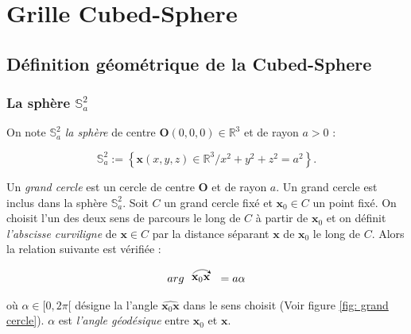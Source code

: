 \chapter{Grille Cubed-Sphere}

\section{Définition géométrique de la Cubed-Sphere}

\subsection{La sphère $\mathbb{S}_a^2$}

On note $\mathbb{S}_a^2$ \textit{la sphère} de centre $\mathbf{O} (0,0,0) \in \mathbb{R}^3$ et de rayon $a>0$ :

\begin{equation}
\mathbb{S}_a^2 := \left\lbrace
\mathbf{x} (x,y,z) \in \mathbb{R}^3 / x^2+y^2+z^2 = a^2
\right\rbrace.
\end{equation} 

Un \textit{grand cercle} est un cercle de centre $\mathbf{O}$ et de rayon $a$. Un grand cercle est inclus dans la sphère $\mathbb{S}_a^2$.
Soit $C$ un grand cercle fixé et $\mathbf{x}_0 \in C$ un point fixé. On choisit l'un des deux sens de parcours le long de $C$ à partir de $\mathbf{x}_0$ et on définit \textit{l'abscisse curviligne} de $\mathbf{x} \in C$ par la distance séparant $\mathbf{x}$ de $\mathbf{x}_0$ le long de $C$. Alors la relation suivante est vérifiée :

\begin{equation}
arg \longarc{\mathbf{x}_0  \mathbf{x}} = a \alpha
\end{equation}

où $\alpha \in [ 0, 2 \pi[$ désigne la l'angle $\widehat{\mathbf{x}_0  \mathbf{x}}$ dans le sens choisit (Voir figure \ref{fig: grand cercle}). $\alpha$ est \textit{l'angle géodésique} entre $\mathbf{x}_0$ et $\mathbf{x}$.

